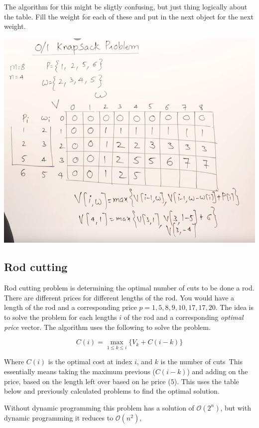 The algorithm for this might be sligtly confusing, but just thing logically about the table. Fill the weight for each of these and put in the next object for the next weight.

\includegraphics[width=\textwidth]{images/01Knapsack.png}

\subsection{Rod cutting}

Rod cutting problem is determining the optimal number of cuts to be done a rod. There are different prices for different lengths of the rod. You would have a length of the rod and a corresponding price $p = {1, 5, 8, 9, 10, 17, 17, 20}$. The idea is to solve the problem for each lengths $i$ of the rod and a corresponding \emph{optimal price} vector. The algorithm uses the following  to solve the problem. 

\begin{equation}
    C(i)=\max_{1\leq k \leq i}\{V_k + C(i-k)\}
\end{equation}

Where $C(i)$ is the optimal cost at index $i$, and $k$ is the number of cuts\, 
This essentially means taking the maximum previous ($C(i-k)$) and adding on the price, based on the length left over based on he price ($5$). This uses the table below and previously calculated problems to find the optimal solution. 

Without dynamic programming this problem has a solution of $\mathcal{O}(2^n)$, but with dynamic programming it reduces to $\mathcal{O}(n^2)$,

